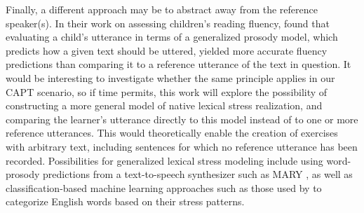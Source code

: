 
	
	Finally, a different approach may be to abstract away from the reference speaker(s). In their work on assessing children's reading fluency, \textcite{Duong2011} found that evaluating a child's utterance in terms of a generalized prosody model, which predicts how a given text should be uttered, yielded more accurate fluency predictions than comparing it to a reference utterance of the text in question. It would be interesting to investigate whether the same principle applies in our CAPT scenario, so if time permits, this work will explore the possibility of constructing a more general model of native lexical stress realization, and comparing the learner's utterance directly to this model instead of to one or more reference utterances. 
This would 
theoretically enable the creation of exercises with arbitrary text, including sentences for which no reference utterance has been recorded. 
%
Possibilities for generalized lexical stress modeling include using word-prosody predictions from a text-to-speech synthesizer such as MARY \citep{Schroeder2003}, as well as
classification-based machine learning approaches such as those used by \textcite{Shahin2012a,Kim2011} to categorize English words based on their stress patterns.
%

